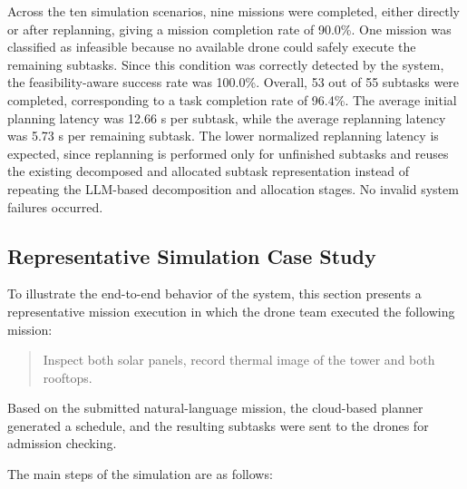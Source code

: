 

Across the ten simulation scenarios, nine missions were completed, either directly or after
replanning, giving a mission completion rate of 90.0\%. One mission was classified as
infeasible because no available drone could safely execute the remaining subtasks. Since this
condition was correctly detected by the system, the feasibility-aware success rate was 100.0\%.
Overall, 53 out of 55 subtasks were completed, corresponding to a task completion rate of
96.4\%. The average initial planning latency was 12.66 s per subtask, while the average
replanning latency was 5.73 s per remaining subtask. The lower normalized replanning latency is 
expected, since replanning is performed only for unfinished subtasks and reuses the existing 
decomposed and allocated subtask representation instead of repeating the LLM-based decomposition 
and allocation stages. No invalid system failures occurred.

\subsection{Representative Simulation Case Study}
To illustrate the end-to-end behavior of the system, this section presents a representative
mission execution in which the drone team executed the following mission:

\begin{quote}
Inspect both solar panels, record thermal image of the tower and both rooftops.
\end{quote}

Based on the submitted natural-language mission, the cloud-based planner generated a schedule,
and the resulting subtasks were sent to the drones for admission checking.







The main steps of the simulation are as follows:

